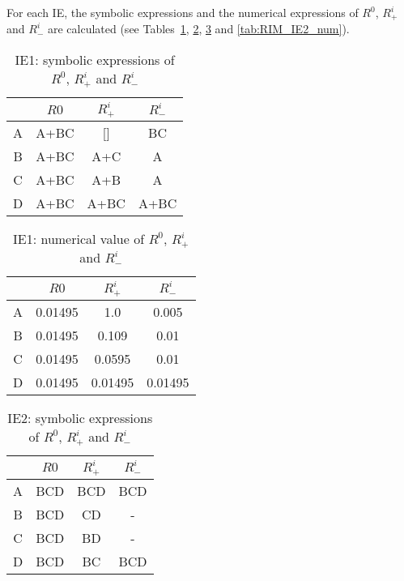 For each IE, the symbolic expressions and the numerical expressions of $R^0$, $R^i_+$ and $R^i_-$ are calculated 
(see Tables~\ref{tab:RIM_IE1_symb}, \ref{tab:RIM_IE1_num}, \ref{tab:RIM_IE2_symb} and \ref{tab:RIM_IE2_num}).

\begin{table}[h!]
  \centering
  \caption{IE1: symbolic expressions of $R^0$, $R^i_+$ and $R^i_-$}
  \label{tab:RIM_IE1_symb}
  \begin{tabular}{c|ccc}
    \toprule
    & $R0$ & $R^i_+$ & $R^i_-$ \\
    \midrule
    A & A+BC & []   & BC   \\
    B & A+BC & A+C  & A    \\
    C & A+BC & A+B  & A    \\
    D & A+BC & A+BC & A+BC \\
    \bottomrule
  \end{tabular}
\end{table}

\begin{table}[h!]
  \centering
  \caption{IE1: numerical value of $R^0$, $R^i_+$ and $R^i_-$}
  \label{tab:RIM_IE1_num}
  \begin{tabular}{c|ccc}
    \toprule
    & $R0$ & $R^i_+$ & $R^i_-$ \\
    \midrule
    A & 0.01495 & 1.0     & 0.005   \\
    B & 0.01495 & 0.109   & 0.01    \\
    C & 0.01495 & 0.0595  & 0.01    \\
    D & 0.01495 & 0.01495 & 0.01495 \\
    \bottomrule
  \end{tabular}
\end{table}

\begin{table}[h!]
  \centering
  \caption{IE2: symbolic expressions of $R^0$, $R^i_+$ and $R^i_-$}
  \label{tab:RIM_IE2_symb}
  \begin{tabular}{c|ccc}
    \toprule
    & $R0$ & $R^i_+$ & $R^i_-$ \\
    \midrule
    A & BCD & BCD & BCD  \\
    B & BCD & CD  & -    \\
    C & BCD & BD  & -    \\
    D & BCD & BC  & BCD  \\
    \bottomrule
  \end{tabular}
\end{table}

